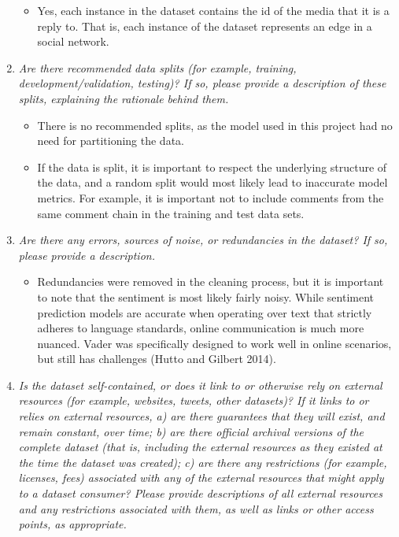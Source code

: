 \documentclass[
]{article}
\providecommand{\tightlist}{%
  \setlength{\itemsep}{0pt}\setlength{\parskip}{0pt}}
\begin{document}
\begin{enumerate}
  \begin{itemize}
  \tightlist
  \item
    Yes, each instance in the dataset contains the id of the media that it is a reply to. That is, each instance of the dataset represents an edge in a social network.
  \end{itemize}
\item
  \emph{Are there recommended data splits (for example, training, development/validation, testing)? If so, please provide a description of these splits, explaining the rationale behind them.}

  \begin{itemize}
  \tightlist
  \item
    There is no recommended splits, as the model used in this project had no need for partitioning the data.
  \item
    If the data is split, it is important to respect the underlying structure of the data, and a random split would most likely lead to inaccurate model metrics. For example, it is important not to include comments from the same comment chain in the training and test data sets.
  \end{itemize}
\item
  \emph{Are there any errors, sources of noise, or redundancies in the dataset? If so, please provide a description.}

  \begin{itemize}
  \tightlist
  \item
    Redundancies were removed in the cleaning process, but it is important to note that the sentiment is most likely fairly noisy. While sentiment prediction models are accurate when operating over text that strictly adheres to language standards, online communication is much more nuanced. Vader was specifically designed to work well in online scenarios, but still has challenges (Hutto and Gilbert 2014).
  \end{itemize}
\item
  \emph{Is the dataset self-contained, or does it link to or otherwise rely on external resources (for example, websites, tweets, other datasets)? If it links to or relies on external resources, a) are there guarantees that they will exist, and remain constant, over time; b) are there official archival versions of the complete dataset (that is, including the external resources as they existed at the time the dataset was created); c) are there any restrictions (for example, licenses, fees) associated with any of the external resources that might apply to a dataset consumer? Please provide descriptions of all external resources and any restrictions associated with them, as well as links or other access points, as appropriate.}


\end{enumerate}
\end{document}
